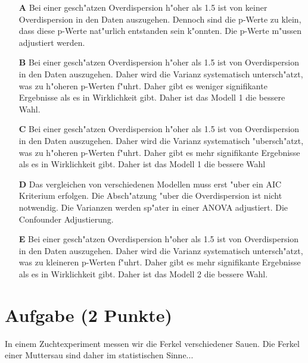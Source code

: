 \documentclass[a4paper, 9pt]{scrartcl}\usepackage[]{graphicx}\usepackage[]{xcolor}
\begin{document}
\begin{enumerate}
\item [\textbf{A} \msquare] Bei einer gesch{"a}tzen Overdispersion h{"o}her als 1.5 ist von keiner Overdispersion in den Daten auszugehen. Dennoch sind die p-Werte zu klein, dass diese p-Werte nat{"u}rlich entstanden sein k{"o}nnten. Die p-Werte m{"u}ssen adjustiert werden.
\item [\textbf{B} \msquare] Bei einer gesch{"a}tzen Overdispersion h{"o}her als 1.5 ist von Overdispersion in den Daten auszugehen. Daher wird die Varianz systematisch untersch{"a}tzt, was zu h{"o}heren p-Werten f{"u}hrt. Daher gibt es weniger signifikante Ergebnisse als es in Wirklichkeit gibt. Daher ist das Modell 1 die bessere Wahl.
\item [\textbf{C} \msquare] Bei einer gesch{"a}tzen Overdispersion h{"o}her als 1.5 ist von Overdispersion in den Daten auszugehen. Daher wird die Varianz systematisch {"u}bersch{"a}tzt, was zu h{"o}heren p-Werten f{"u}hrt. Daher gibt es mehr signifikante Ergebnisse als es in Wirklichkeit gibt. Daher ist das Modell 1 die bessere Wahl
\item [\textbf{D} \msquare] Das vergleichen von verschiedenen Modellen muss erst {"u}ber ein AIC Kriterium erfolgen. Die Absch{"a}tzung {"u}ber die Overdispersion ist nicht notwendig. Die Varianzen werden sp{"a}ter in einer ANOVA adjustiert. Die Confounder Adjustierung.
\item [\textbf{E} \msquare] Bei einer gesch{"a}tzen Overdispersion h{"o}her als 1.5 ist von Overdispersion in den Daten auszugehen. Daher wird die Varianz systematisch untersch{"a}tzt, was zu kleineren p-Werten f{"u}hrt. Daher gibt es mehr signifikante Ergebnisse als es in Wirklichkeit gibt. Daher ist das Modell 2 die bessere Wahl.
\end{enumerate}

\section{Aufgabe \hfill (2 Punkte)}

In einem Zuchtexperiment messen wir die Ferkel verschiedener Sauen. Die
Ferkel einer Muttersau sind daher im statistischen Sinne... 
\end{document}
